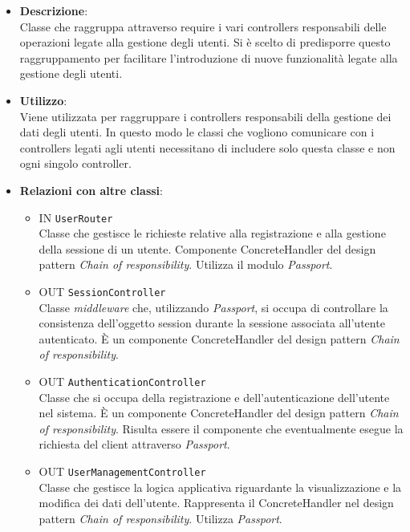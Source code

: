 \begin{itemize}
	\item 
	\textbf{Descrizione}:\\
	Classe che raggruppa attraverso require i vari controllers responsabili delle operazioni legate alla gestione degli utenti. Si è scelto di predisporre questo raggruppamento per facilitare l'introduzione di nuove funzionalità legate alla gestione degli utenti.
	\item \textbf{Utilizzo}:\\
	Viene utilizzata per raggruppare i controllers responsabili della gestione dei dati degli utenti. In questo modo le classi che vogliono comunicare con i controllers legati agli utenti necessitano di includere solo questa classe e non ogni singolo controller.
	\item \textbf{Relazioni con altre classi}:
	\begin{itemize}
		\item 
			IN	\texttt{UserRouter}\\
			Classe che gestisce le richieste relative alla registrazione e alla gestione della sessione di un utente. Componente ConcreteHandler del design pattern \textit{Chain of responsibility}. Utilizza il modulo \textit{Passport}.		
		\item 
			OUT \texttt{SessionController}\\
			Classe \textit{middleware} che, utilizzando \textit{Passport}, si occupa di controllare la consistenza dell'oggetto session durante la sessione associata all'utente autenticato. È un componente ConcreteHandler del design pattern \textit{Chain of responsibility}.
		\item 
			OUT \texttt{AuthenticationController}\\
			Classe che si occupa della registrazione e dell'autenticazione dell'utente nel sistema. È un componente ConcreteHandler del design pattern \textit{Chain of responsibility}. Risulta essere il componente che eventualmente esegue la richiesta del client attraverso \textit{Passport}.	
		\item 
			OUT \texttt{UserManagementController}\\
			Classe che gestisce la logica applicativa riguardante la visualizzazione e la modifica dei dati dell'utente.
			Rappresenta il ConcreteHandler nel design pattern \textit{Chain of responsibility}. Utilizza \textit{Passport}.
	\end{itemize}
\end{itemize}
